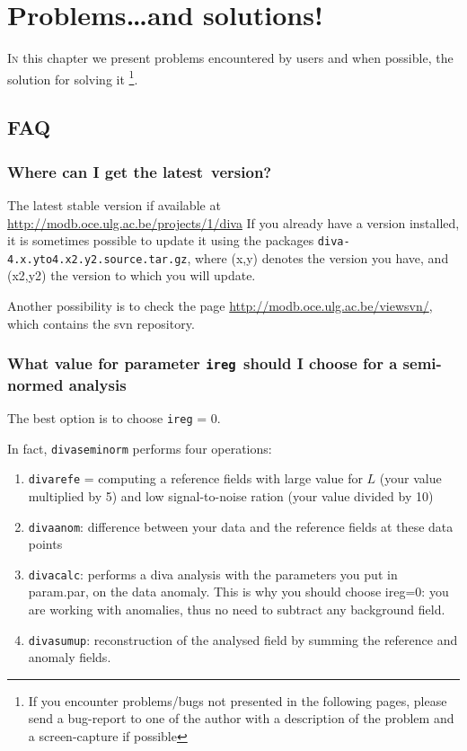 \chapter{Problems\ldots and solutions!}

\lettrine[lines=2]{I}{n} this chapter we present problems encountered by users and when possible, the solution for solving it \footnote{If you encounter problems/bugs not presented in the following pages, please send a bug-report to one of the author with a description of the problem and a screen-capture if possible}. 

\minitoc


\section{FAQ}

\subsection{Where can I get the latest \diva\,version?}

The latest stable version if available at \url{http://modb.oce.ulg.ac.be/projects/1/diva} If you already have a version installed, it is sometimes possible to update it using the packages \texttt{diva-4.x.yto4.x2.y2.source.tar.gz}, where (x,y) denotes the version you have, and (x2,y2) the version to which you will update. 

Another possibility is to check the page \url{http://modb.oce.ulg.ac.be/viewsvn/}, which contains the svn repository.

\subsection{What value for parameter \texttt{ireg }should I choose for a semi-normed analysis}


The best option is to choose \texttt{ireg} = 0.


In fact, \texttt{divaseminorm} performs four operations:
\begin{enumerate}
\item \texttt{divarefe} = computing a reference fields with large value for $L$ (your
value multiplied by 5) and low signal-to-noise ration (your value divided
by 10)

\item \texttt{divaanom}: difference between your data and the reference fields at
these data points

\item \texttt{divacalc}: performs a diva analysis with the parameters you put in
param.par, on the data anomaly. This is why you should choose ireg=0: you
are working with anomalies, thus no need to subtract any background field.

\item \texttt{divasumup}: reconstruction of the analysed field by summing the reference
and anomaly fields.

\end{enumerate}


